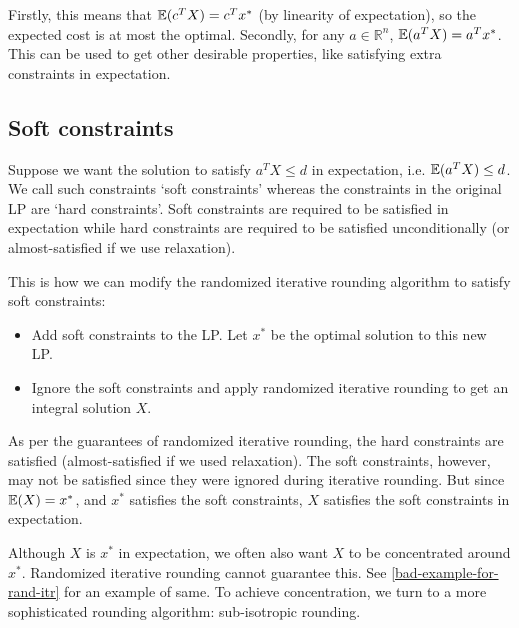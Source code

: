 Firstly, this means that $\operatorname{\mathbb{E}}(c^TX) = c^Tx^*$ (by linearity of expectation),
so the expected cost is at most the optimal.
Secondly, for any $a \in \mathbb{R}^n$, $\operatorname{\mathbb{E}}(a^TX) = a^Tx^*$.
This can be used to get other desirable properties,
like satisfying extra constraints in expectation.

\subsection{Soft constraints}

Suppose we want the solution to satisfy $a^TX \le d$ in expectation, i.e. $\operatorname{\mathbb{E}}(a^TX) \le d$.
We call such constraints `soft constraints'
whereas the constraints in the original LP are `hard constraints'.
Soft constraints are required to be satisfied in expectation while hard constraints
are required to be satisfied unconditionally (or almost-satisfied if we use relaxation).

This is how we can modify the randomized iterative rounding algorithm
to satisfy soft constraints:
\begin{itemize}
\item Add soft constraints to the LP. Let $x^*$ be the optimal solution to this new LP.
\item Ignore the soft constraints and apply randomized iterative rounding to get an integral solution $X$.
\end{itemize}
As per the guarantees of randomized iterative rounding, the hard constraints are
satisfied (almost-satisfied if we used relaxation).
The soft constraints, however, may not be satisfied since they were ignored during iterative rounding.
But since $\operatorname{\mathbb{E}}(X) = x^*$, and $x^*$ satisfies the soft constraints,
$X$ satisfies the soft constraints in expectation.

Although $X$ is $x^*$ in expectation, we often also want $X$ to be concentrated around $x^*$.
Randomized iterative rounding cannot guarantee this.
See \ref{bad-example-for-rand-itr} for an example of same.
To achieve concentration, we turn to a more sophisticated rounding algorithm: sub-isotropic rounding.
